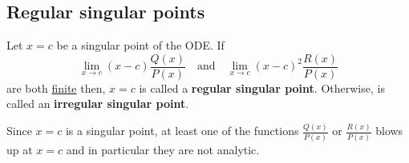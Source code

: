 \documentclass[12pt, a4paper]{article}
\begin{document}

\subsection{Regular singular points}

\begin{definition}
    Let \(x=c\) be a singular point of the ODE. If 
    \[\lim_{x\to c}(x-c) \frac{Q(x)}{P(x)} \quad \text{and} \quad \lim_{x\to c} (x-c)^2 \frac{R(x)}{P(x)}\]
    are both \underline{finite} then, \(x=c\) is called a \textbf{regular singular point}. Otherwise, is called an \textbf{irregular singular point}.
\end{definition}

\begin{mdremark}
    Since \(x=c\) is a singular point, at least one of the functions \(\frac{Q(x)}{P(x)}\) or \(\frac{R(x)}{P(x)}\) blows up at \(x=c\) and in particular they are not analytic.
\end{mdremark}
\end{document}
